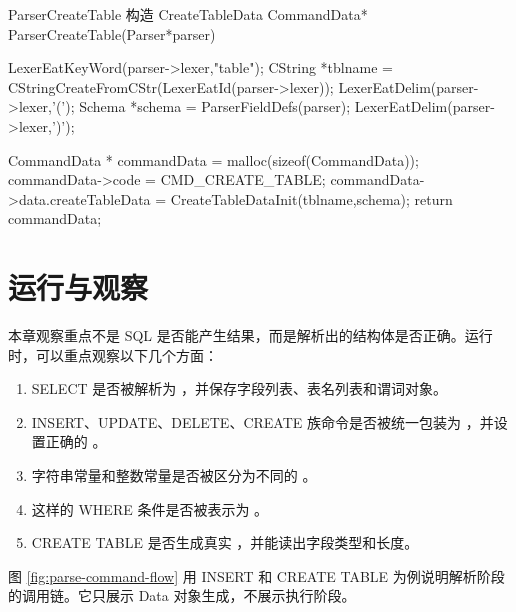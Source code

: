 \begin{dbcode}{ParserCreateTable 构造 CreateTableData}
CommandData* ParserCreateTable(Parser*parser){
    LexerEatKeyWord(parser->lexer,"table");
    CString *tblname = CStringCreateFromCStr(LexerEatId(parser->lexer));
    LexerEatDelim(parser->lexer,'(');
    Schema *schema = ParserFieldDefs(parser);
    LexerEatDelim(parser->lexer,')');

    CommandData * commandData = malloc(sizeof(CommandData));
    commandData->code = CMD_CREATE_TABLE;
    commandData->data.createTableData = CreateTableDataInit(tblname,schema);
    return commandData;
}
\end{dbcode}

\section{运行与观察}
\label{sec:parse-run}

本章观察重点不是 SQL 是否能产生结果，而是解析出的结构体是否正确。运行  时，可以重点观察以下几个方面：

\begin{enumerate}
  \item SELECT 是否被解析为 ，并保存字段列表、表名列表和谓词对象。
  \item INSERT、UPDATE、DELETE、CREATE 族命令是否被统一包装为 ，并设置正确的 。
  \item 字符串常量和整数常量是否被区分为不同的 。
  \item {} 这样的 WHERE 条件是否被表示为 。
  \item CREATE TABLE 是否生成真实 ，并能读出字段类型和长度。
\end{enumerate}

图 \ref{fig:parse-command-flow} 用 INSERT 和 CREATE TABLE 为例说明解析阶段的调用链。它只展示 Data 对象生成，不展示执行阶段。

